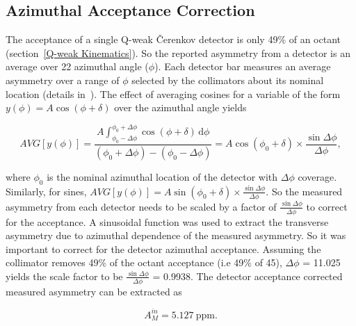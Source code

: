 \subsection{Azimuthal Acceptance Correction}
\label{Azimuthal Acceptance Correction}

The acceptance of a single Q-weak \v{C}erenkov detector is only 49\% of an octant (section~\ref{Q-weak Kinematics}). So the reported asymmetry from a detector is an average over 22\degrees{} azimuthal angle ($\phi$). Each detector bar measures an average asymmetry over a range of $\phi$ selected by the collimators about its nominal location (details in~\cite{elog:birchall_analysis373}). 
The effect of averaging cosines for a variable of the form $y(\phi) = A \cos(\phi + \delta)$ over the azimuthal angle yields 

\begin{equation} \label{equ:eqDetectorNonlinearity}
AVG[y(\phi)] = \frac{ A\int_{\phi_{0}-\Delta\phi}^{\phi_{0}+\Delta\phi} \cos(\phi+\delta)\,\mathrm{d}\phi }{(\phi_{0}+\Delta\phi)-(\phi_{0}-\Delta\phi)} = A \cos (\phi_{0} + \delta) \times \frac{\sin\Delta\phi}{\Delta\phi}, 
\end{equation}

where $\phi_{0}$ is the nominal azimuthal location of the detector with $\Delta\phi$ coverage. Similarly, for sines, $AVG[y(\phi)] = A \sin (\phi_{0} + \delta) \times \frac{\sin\Delta\phi}{\Delta\phi}$. So the measured asymmetry from each detector needs to be scaled by a factor of $\frac{\sin\Delta\phi}{\Delta\phi}$ to correct for the acceptance. 
A sinusoidal function was used to extract the transverse asymmetry due to azimuthal dependence of the measured asymmetry. So it was important to correct for the detector azimuthal acceptance. Assuming the collimator removes 49\% of the octant acceptance (i.e 49\% of 45\degrees{}), $\Delta\phi$ = 11.025\degrees{}
yields the scale factor to be $\frac{\sin\Delta\phi}{\Delta\phi}$ = 0.9938.
The detector acceptance corrected measured asymmetry can be extracted as

\begin{equation} \label{equ:asymmetryDetAcptCorrected}
A_{M}^{in} = 5.127~\text{ppm}.
\end{equation}


